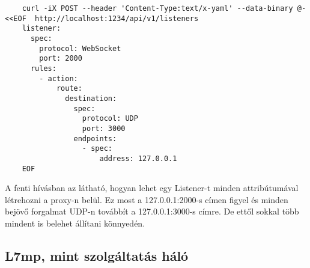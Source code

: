\begin{lstlisting}
	curl -iX POST --header 'Content-Type:text/x-yaml' --data-binary @- <<EOF  http://localhost:1234/api/v1/listeners
	listener:
	  spec:
	    protocol: WebSocket
	    port: 2000
	  rules:
	    - action:
	        route:
	          destination:
	            spec:
  	              protocol: UDP
	              port: 3000
	            endpoints:
	              - spec:
	                  address: 127.0.0.1
	EOF
\end{lstlisting}

A fenti hívásban az látható, hogyan lehet egy Listener-t minden attribútumával 
létrehozni a proxy-n belül. Ez most a 127.0.0.1:2000-s címen figyel és minden 
bejövő forgalmat UDP-n továbbít a 127.0.0.1:3000-s címre. De ettől sokkal több
mindent is belehet állítani könnyedén. 

\subsection{L7mp, mint szolgáltatás háló}